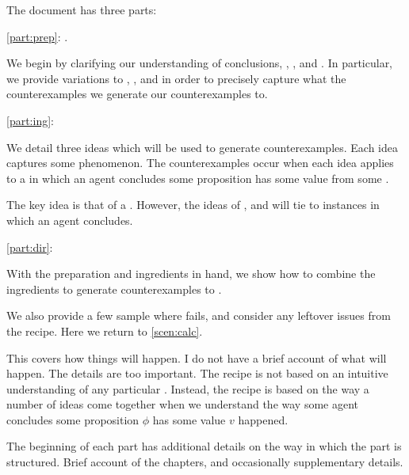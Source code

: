 \begin{note}
  The document has three parts:

  \begin{TOCEnum}
  \item
    \autoref{part:prep}: .

    We begin by clarifying our understanding of conclusions, \qWhy{}, \qHow{}, and \issueInclusion{}.
    In particular, we provide variations to \qWhy{}, \qHow{}, and \issueInclusion{} in order to precisely capture what the counterexamples we generate our counterexamples to.
  \item
    \autoref{part:ing}: 

    We detail three ideas which will be used to generate counterexamples.
    Each idea captures some phenomenon.
    The counterexamples occur when each idea applies to a  in which an agent concludes some proposition has some value from some \pool{}.

    The key idea is that of a \fc{}.
    However, the ideas of \tC{}, and \requ{} will tie  to instances in which an agent concludes.
  \item
    \autoref{part:dir}: 

    With the preparation and ingredients in hand, we show how to combine the ingredients to generate counterexamples to \issueInclusion{}.

    We also provide a few sample  where \issueInclusion{} fails, and consider any leftover issues from the recipe.
    Here we return to \autoref{scen:calc}.
  \end{TOCEnum}

  This covers how things will happen.
  I do not have a brief account of what will happen.
  The details are too important.
  The recipe is not based on an intuitive understanding of any particular \scen{}.
  Instead, the recipe is based on the way a number of ideas come together when we understand the way some agent concludes some proposition \(\phi\) has some value \(v\) happened.

  The beginning of each part has additional details on the way in which the part is structured.
  Brief account of the chapters, and occasionally supplementary details.
\end{note}



